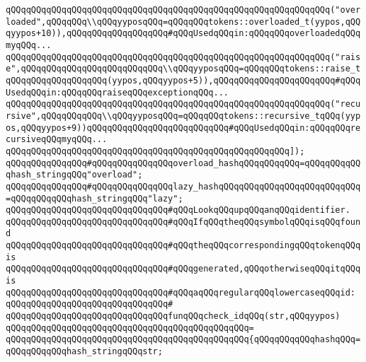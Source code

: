 \verb|qQQqqQQqqQQqqQQqqQQqqQQqqQQqqQQqqQQqqQQqqQQqqQQqqQQqqQQqqQQqqQQq("overloaded",qQQqqQQq\\qQQqyyposqQQq=qQQqqQQqtokens::overloaded_t(yypos,qQQqyypos+10)),qQQqqQQqqQQqqQQqqQQq#qQQqUsedqQQqin:qQQqqQQqoverloadedqQQqmyqQQq...|\newline
\verb|qQQqqQQqqQQqqQQqqQQqqQQqqQQqqQQqqQQqqQQqqQQqqQQqqQQqqQQqqQQqqQQq("raise",qQQqqQQqqQQqqQQqqQQqqQQqqQQq\\qQQqyyposqQQq=qQQqqQQqtokens::raise_tqQQqqQQqqQQqqQQqqQQq(yypos,qQQqyypos+5)),qQQqqQQqqQQqqQQqqQQqqQQq#qQQqUsedqQQqin:qQQqqQQqraiseqQQqexceptionqQQq...|\newline
\verb|qQQqqQQqqQQqqQQqqQQqqQQqqQQqqQQqqQQqqQQqqQQqqQQqqQQqqQQqqQQqqQQq("recursive",qQQqqQQqqQQq\\qQQqyyposqQQq=qQQqqQQqtokens::recursive_tqQQq(yypos,qQQqyypos+9))qQQqqQQqqQQqqQQqqQQqqQQqqQQq#qQQqUsedqQQqin:qQQqqQQqrecursiveqQQqmyqQQq...|\newline
\verb|qQQqqQQqqQQqqQQqqQQqqQQqqQQqqQQqqQQqqQQqqQQqqQQqqQQqqQQq]);|\newline
\newline
\verb|qQQqqQQqqQQqqQQq#qQQqqQQqqQQqqQQqoverload_hashqQQqqQQqqQQq=qQQqqQQqqQQqhash_stringqQQq"overload";|\newline
\verb|qQQqqQQqqQQqqQQq#qQQqqQQqqQQqqQQqlazy_hashqQQqqQQqqQQqqQQqqQQqqQQqqQQq=qQQqqQQqqQQqhash_stringqQQq"lazy";|\newline
\newline
\verb|qQQqqQQqqQQqqQQqqQQqqQQqqQQqqQQq#qQQqLookqQQqupqQQqanqQQqidentifier.|\newline
\verb|qQQqqQQqqQQqqQQqqQQqqQQqqQQqqQQq#qQQqIfqQQqtheqQQqsymbolqQQqisqQQqfound|\newline
\verb|qQQqqQQqqQQqqQQqqQQqqQQqqQQqqQQq#qQQqtheqQQqcorrespondingqQQqtokenqQQqis|\newline
\verb|qQQqqQQqqQQqqQQqqQQqqQQqqQQqqQQq#qQQqgenerated,qQQqotherwiseqQQqitqQQqis|\newline
\verb|qQQqqQQqqQQqqQQqqQQqqQQqqQQqqQQq#qQQqaqQQqregularqQQqlowercaseqQQqid:|\newline
\verb|qQQqqQQqqQQqqQQqqQQqqQQqqQQqqQQq#|\newline
\verb|qQQqqQQqqQQqqQQqqQQqqQQqqQQqqQQqfunqQQqcheck_idqQQq(str,qQQqyypos)|\newline
\verb|qQQqqQQqqQQqqQQqqQQqqQQqqQQqqQQqqQQqqQQqqQQqqQQq=|\newline
\verb|qQQqqQQqqQQqqQQqqQQqqQQqqQQqqQQqqQQqqQQqqQQqqQQq{qQQqqQQqqQQqhashqQQq=qQQqqQQqqQQqhash_stringqQQqstr;|\newline
